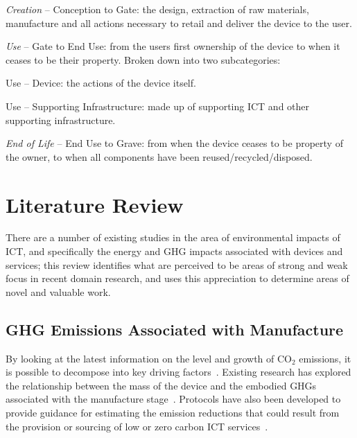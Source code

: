 \documentclass[conference]{IEEEtran}
\begin{document}
\begin{compactitem}
\item {\emph{Creation}} -- Conception to Gate: the design, extraction of raw
  materials, manufacture and all actions necessary to retail and
  deliver the device to the user.
\item {\emph{Use}} -- Gate to End Use: from the users first ownership
  of the device to when it ceases to be their property. Broken down
  into two subcategories:
\begin{compactitem}
\item Use -- Device: the actions of the device itself.
\item Use -- Supporting Infrastructure: made up of supporting ICT and
  other supporting infrastructure.
\end{compactitem}
\item {\emph{End of Life}} -- End Use to Grave: from when the device
  ceases to be property of the owner, to when all components have been
  reused/recycled/disposed.
\end{compactitem}


\section{Literature Review}

There are a number of existing studies in the area of environmental
impacts of ICT, and specifically the energy and GHG impacts associated
with devices and services; this review identifies what are perceived
to be areas of strong and weak focus in recent domain research, and
uses this appreciation to determine areas of novel and valuable work.


\subsection{GHG Emissions Associated with Manufacture}

By looking at the latest information on the level and growth of CO$_2$
emissions, it is possible to decompose into key driving
factors~\cite{ieaco2em:2014}. Existing research has explored the
relationship between the mass of the device and the embodied GHGs
associated with the manufacture
stage~\cite{williams:2004,teehan-et-al:2010}. Protocols have also been
developed to provide guidance for estimating the emission reductions
that could result from the provision or sourcing of low or zero carbon
ICT services~\cite{steenhof-et-al:2012}.
\end{document}
